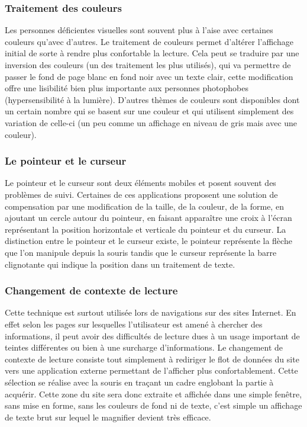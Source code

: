 \documentclass[french,a4paper]{report}
\begin{document}
\subsubsection{Traitement des couleurs}
Les personnes déficientes visuelles sont souvent plus à l'aise avec certaines couleurs qu'avec d'autres. Le traitement de couleurs permet d'altérer l'affichage initial de sorte à rendre plus confortable la lecture. Cela peut se traduire par une inversion des couleurs (un des traitement les plus utilisés), qui va permettre de passer le fond de page blanc en fond noir avec un texte clair, cette modification offre une lisibilité bien plus importante aux personnes photophobes (hypersensibilité à la lumière). D'autres thèmes de couleurs sont disponibles dont un certain nombre qui se basent sur une couleur et qui utilisent simplement des variation de celle-ci (un peu comme un affichage en niveau de gris mais avec une couleur).
\subsubsection{Le pointeur et le curseur}
Le pointeur et le curseur sont deux éléments mobiles et posent souvent des problèmes de suivi. Certaines de ces applications proposent une solution de compensation par une modification de la taille, de la couleur, de la forme, en ajoutant un cercle autour du pointeur, en faisant apparaître une croix à l'écran représentant la position horizontale et verticale du pointeur et du curseur.
\newline
La distinction entre le pointeur et le curseur existe, le pointeur représente la flèche que l'on manipule depuis la souris tandis que le curseur représente la barre clignotante qui indique la position dans un traitement de texte.
\subsubsection{Changement de contexte de lecture}
Cette technique est surtout utilisée lors de navigations sur des sites Internet. En effet selon les pages sur lesquelles l'utilisateur est amené à chercher des informations, il peut avoir des difficultés de lecture dues à un usage important de teintes différentes ou bien à une surcharge d'informations. Le changement de contexte de lecture consiste tout simplement à rediriger le flot de données du site vers une application externe permettant de l'afficher plus confortablement. Cette sélection se réalise avec la souris en traçant un cadre englobant la partie à acquérir. Cette zone du site sera donc extraite et affichée dans une simple fenêtre, sans mise en forme, sans les couleurs de fond ni de texte, c'est simple un affichage de texte brut sur lequel le magnifier devient très efficace.
\end{document}
